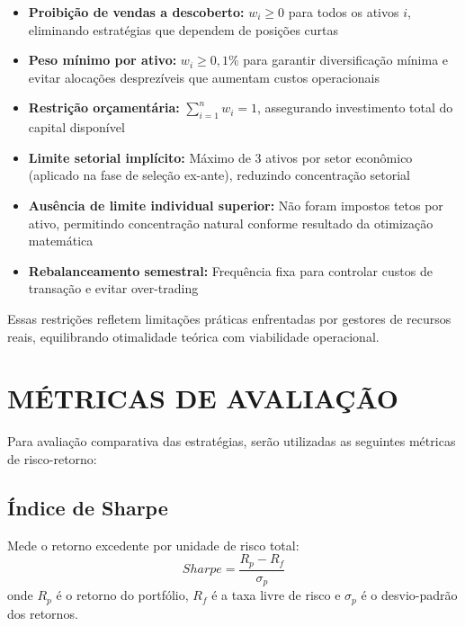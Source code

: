 \begin{itemize}
    \item \textbf{Proibição de vendas a descoberto:} $w_i \geq 0$ para todos os ativos $i$, eliminando estratégias que dependem de posições curtas
    
    \item \textbf{Peso mínimo por ativo:} $w_i \geq 0,1\%$ para garantir diversificação mínima e evitar alocações desprezíveis que aumentam custos operacionais
    
    \item \textbf{Restrição orçamentária:} $\sum_{i=1}^{n} w_i = 1$, assegurando investimento total do capital disponível
    
    \item \textbf{Limite setorial implícito:} Máximo de 3 ativos por setor econômico (aplicado na fase de seleção ex-ante), reduzindo concentração setorial
    
    \item \textbf{Ausência de limite individual superior:} Não foram impostos tetos por ativo, permitindo concentração natural conforme resultado da otimização matemática
    
    \item \textbf{Rebalanceamento semestral:} Frequência fixa para controlar custos de transação e evitar over-trading
\end{itemize}

Essas restrições refletem limitações práticas enfrentadas por gestores de recursos reais, equilibrando otimalidade teórica com viabilidade operacional.

\section{MÉTRICAS DE AVALIAÇÃO}

Para avaliação comparativa das estratégias, serão utilizadas as seguintes métricas de risco-retorno:

\subsection{Índice de Sharpe}
Mede o retorno excedente por unidade de risco total:
\begin{equation}
Sharpe = \frac{R_p - R_f}{\sigma_p}
\end{equation}
onde $R_p$ é o retorno do portfólio, $R_f$ é a taxa livre de risco e $\sigma_p$ é o desvio-padrão dos retornos.

